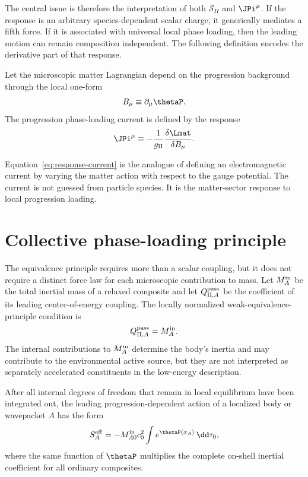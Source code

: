 \documentclass[12pt]{article}
\begin{document}
The central issue is therefore the interpretation of both \(\mathcal S_\Pi\) and \(\JPi^\mu\). If the response is an arbitrary species-dependent scalar charge, it generically mediates a fifth force. If it is associated with universal local phase loading, then the leading motion can remain composition independent. The following definition encodes the derivative part of that response.
\begin{definition}
Let the microscopic matter Lagrangian depend on the progression background through the local one-form
\begin{equation}
    B_\mu \equiv \partial_\mu \thetaP.
    \label{eq:Bmu}
\end{equation}
The progression phase-loading current is defined by the response
\begin{equation}
    \JPi^\mu \equiv -\frac{1}{g_\Pi}\frac{\delta \Lmat}{\delta B_\mu}.
    \label{eq:response-current}
\end{equation}
\end{definition}

Equation~\eqref{eq:response-current} is the analogue of defining an electromagnetic current by varying the matter action with respect to the gauge potential. The current is not guessed from particle species. It is the matter-sector response to local progression loading.
\section{Collective phase-loading principle}

The equivalence principle requires more than a scalar coupling, but it does not require a distinct force law for each microscopic contribution to mass.  Let \(M_A^{\rm in}\) be the total inertial mass of a relaxed composite and let \(Q_{\Pi,A}^{\rm pass}\) be the coefficient of its leading center-of-energy coupling.  The locally normalized weak-equivalence-principle condition is
\begin{equation}
    Q_{\Pi,A}^{\rm pass}=M_A^{\rm in}.
    \label{eq:normalized-universal-charge}
\end{equation}
The internal contributions to \(M_A^{\rm in}\) determine the body's inertia and may contribute to the environmental active source, but they are not interpreted as separately accelerated constituents in the low-energy description.

\begin{assumption}
After all internal degrees of freedom that remain in local equilibrium have been integrated out, the leading progression-dependent action of a localized body or wavepacket \(A\) has the form
\begin{equation}
    S_A^{\rm eff}=-M_{A0}^{\rm in}c_0^2\int e^{\thetaP(x_A)}\,\dd\tau_0,
    \label{eq:normalized-point-action}
\end{equation}
where the same function of \(\thetaP\) multiplies the complete on-shell inertial coefficient for all ordinary composites.
\end{assumption}
\end{document}
